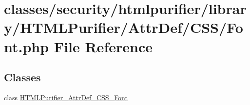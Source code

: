 \hypertarget{AttrDef_2CSS_2Font_8php}{\section{classes/security/htmlpurifier/library/\+H\+T\+M\+L\+Purifier/\+Attr\+Def/\+C\+S\+S/\+Font.php File Reference}
\label{AttrDef_2CSS_2Font_8php}
}
\subsection*{Classes}
\begin{DoxyCompactItemize}
\item 
class \hyperlink{classHTMLPurifier__AttrDef__CSS__Font}{H\+T\+M\+L\+Purifier\+\_\+\+Attr\+Def\+\_\+\+C\+S\+S\+\_\+\+Font}
\end{DoxyCompactItemize}
